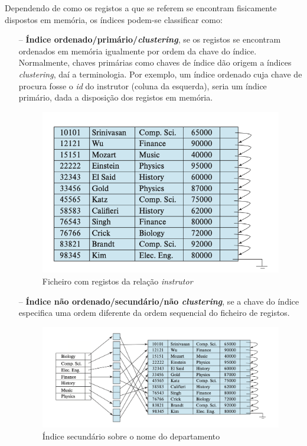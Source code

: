\documentclass[oneside]{book}
\theoremstyle{definition}
\begin{document}
Dependendo de como os registos a que se referem se encontram fisicamente dispostos em memória, os índices podem-se classificar como:
\begin{itemize}
    \item[--] \textbf{Índice ordenado/primário/\textit{clustering}}, se os registos se encontram ordenados em memória igualmente por ordem da chave do índice. Normalmente, chaves primárias como chaves de índice dão origem a índices \textit{clustering}, daí a terminologia. Por exemplo, um índice ordenado cuja chave de procura fosse o \textit{id} do instrutor (coluna da esquerda), seria um índice primário, dada a disposição dos registos em memória.
    \begin{figure}[H]
        \centering
        \includegraphics[scale = 0.75]{cap_indices/indice_primario.png}
        \caption{Ficheiro com registos da relação \textit{instrutor}}
    \end{figure}
    \item[--] \textbf{Índice não ordenado/secundário/não \textit{clustering}}, se a chave do índice especifica uma ordem diferente da ordem sequencial do ficheiro de registos.
    \begin{figure}[H]
        \centering
        \includegraphics[scale = 0.75]{cap_indices/indice_secundario.png}
        \caption{Índice secundário sobre o nome do departamento}
    \end{figure}
\end{itemize}
\end{document}
